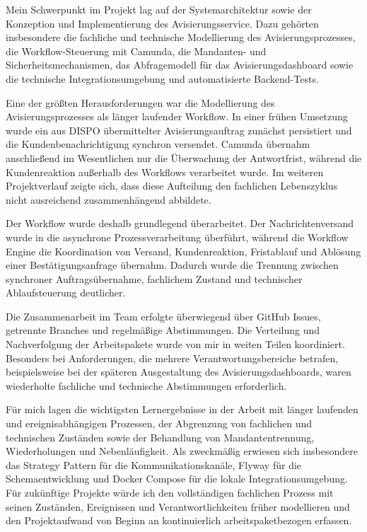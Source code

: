 Mein Schwerpunkt im Projekt lag auf der Systemarchitektur sowie der
Konzeption und Implementierung des Avisierungsservice. Dazu gehörten
insbesondere die fachliche und technische Modellierung des
Avisierungsprozesses, die Workflow-Steuerung mit Camunda, die
Mandanten- und Sicherheitsmechanismen, das Abfragemodell für das
Avisierungsdashboard sowie die technische Integrationsumgebung und
automatisierte Backend-Tests.

Eine der größten Herausforderungen war die Modellierung des
Avisierungsprozesses als länger laufender Workflow. In einer frühen
Umsetzung wurde ein aus DISPO übermittelter Avisierungsauftrag zunächst
persistiert und die Kundenbenachrichtigung synchron versendet. Camunda
übernahm anschließend im Wesentlichen nur die Überwachung der
Antwortfrist, während die Kundenreaktion außerhalb des Workflows
verarbeitet wurde. Im weiteren Projektverlauf zeigte sich, dass diese
Aufteilung den fachlichen Lebenszyklus nicht ausreichend zusammenhängend
abbildete.

Der Workflow wurde deshalb grundlegend überarbeitet. Der
Nachrichtenversand wurde in die asynchrone Prozessverarbeitung
überführt, während die Workflow Engine die Koordination von Versand,
Kundenreaktion, Fristablauf und Ablösung einer Bestätigungsanfrage
übernahm. Dadurch wurde die Trennung zwischen synchroner
Auftragsübernahme, fachlichem Zustand und technischer Ablaufsteuerung
deutlicher.

Die Zusammenarbeit im Team erfolgte überwiegend über GitHub Issues,
getrennte Branches und regelmäßige Abstimmungen. Die Verteilung und
Nachverfolgung der Arbeitspakete wurde von mir in weiten Teilen
koordiniert. Besonders bei Anforderungen, die mehrere
Verantwortungsbereiche betrafen, beispielsweise bei der späteren
Ausgestaltung des Avisierungsdashboards, waren wiederholte fachliche
und technische Abstimmungen erforderlich.

Für mich lagen die wichtigsten Lernergebnisse in der Arbeit mit
länger laufenden und ereignisabhängigen Prozessen, der Abgrenzung von
fachlichen und technischen Zuständen sowie der Behandlung von
Mandantentrennung, Wiederholungen und Nebenläufigkeit. Als zweckmäßig
erwiesen sich insbesondere das Strategy Pattern für die
Kommunikationskanäle, Flyway für die Schemaentwicklung und Docker
Compose für die lokale Integrationsumgebung. Für zukünftige Projekte
würde ich den vollständigen fachlichen Prozess mit seinen Zuständen,
Ereignissen und Verantwortlichkeiten früher modellieren und den
Projektaufwand von Beginn an kontinuierlich arbeitspaketbezogen
erfassen.
